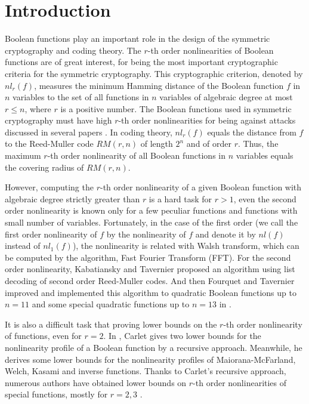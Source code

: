 \documentclass[8pt,oneside]{article}
\newcommand{\0}{\textbf{0}}
\newcommand{\1}{\textbf{1}}
\begin{document}
\section{Introduction}
    Boolean functions play an important role in the design of the symmetric cryptography and coding theory. 
    The $ r $-th order nonlinearities of Boolean functions are of great interest, for being the most important cryptographic criteria for the symmetric cryptography. 
    This cryptographic criterion, denoted by $ nl_r(f) $, measures the minimum Hamming distance of the Boolean function $ f $ in $ n $ variables to the set of all functions in $ n $ variables of algebraic degree at most $ r\le n $, where $ r $ is a positive number. 
    The Boolean functions used in symmetric cryptography must have high $ r $-th order nonlinearities for being against attacks discussed in several papers \cite{Golic1996lower_order_approximation,IwataK1999highorderbentfunction,KnudsenR1996nonlinear_approximation}. 
    In coding theory, $ nl_r(f) $ equals the distance from $ f $ to the Reed-Muller code $ RM(r,n) $ of length $ 2^n $ and of order $ r $. 
    Thus, the maximum $ r $-th order nonlinearity of all Boolean functions in $ n $ variables equals the covering radius of $ RM(r,n) $. 

    However, computing the $ r $-th order nonlinearity of a given Boolean function with algebraic degree strictly greater than $ r $ is a hard task for $ r>1 $, even the second order nonlinearity is known only for a few peculiar functions and functions with small number of variables. 
    Fortunately, in the case of the first order (we call the first order nonlinearity of $ f $ by the nonlinearity of $ f $ and denote it by $ nl(f) $ instead of $ nl_1(f) $), the nonlinearity is related with Walsh transform, which can be computed by the algorithm, Fast Fourier Transform (FFT). 
    For the second order nonlinearity, Kabatiansky and Tavernier \cite{KabatianskyT2005listdecoding_RM_2_n} proposed an algorithm using list decoding of second order Reed-Muller codes. 
    And then Fourquet and Tavernier improved and implemented this algorithm to quadratic Boolean functions up to $ n=11 $ and some special quadratic functions up to $ n=13 $ in \cite{FourquetT2008improved_listdecoding_RM_2_n}.

    It is also a difficult task that proving lower bounds on the $ r $-th order nonlinearity of functions, even for $ r=2 $. 
    In \cite{Carlet2008lowbound_NL_profile}, Carlet gives two lower bounds for the nonlinearity profile of a Boolean function by a recursive approach. Meanwhile, he derives some lower bounds for the nonlinearity profiles of Maiorana-McFarland, Welch, Kasami and inverse functions. 
    Thanks to Carlet's recursive approach, numerous authors have obtained lower bounds on $ r $-th order nonlinearities of special functions, mostly for $ r=2,3 $ \cite{}. 
    
\end{document}
